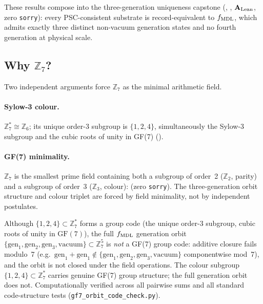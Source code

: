 These results compose into the three-generation uniqueness capstone
(, ,
$\textbf{A}_{\rm Lean}$, zero \texttt{sorry}): every PSC-consistent substrate is record-equivalent to
$f_{\rm MDL}$, which admits exactly three distinct non-vacuum generation states and no
fourth generation at physical scale.

\subsection{Why \texorpdfstring{$\mathbb{Z}_7$}{Z7}?}
\label{sec:why_z7}

Two independent arguments force $\mathbb{Z}_7$ as the minimal arithmetic field.

\paragraph{Sylow-3 colour.}
$\mathbb{Z}_7^* \cong \mathbb{Z}_6$; its unique order-3 subgroup is $\{1,2,4\}$, simultaneously the Sylow-3 subgroup and the cubic roots of unity in GF(7) ().

\paragraph{GF(7) minimality.}
$\mathbb{Z}_7$ is the smallest prime field containing both a subgroup of order~2 ($\mathbb{Z}_2$, parity) and a subgroup of order~3 ($\mathbb{Z}_3$, colour):
 (zero \texttt{sorry}).
The three-generation orbit structure and colour triplet are forced by field minimality, not by independent postulates.

\begin{remark}
\label{rem:not_gf7_group_code}
Although $\{1,2,4\} \subset \mathbb{Z}_7^*$ forms a group code (the unique order-3 subgroup, cubic roots of unity in $\mathrm{GF}(7)$), the full $f_{\rm MDL}$ generation orbit
$\{\mathrm{gen}_1, \mathrm{gen}_2, \mathrm{gen}_3, \mathrm{vacuum}\} \subset \mathbb{Z}_7^5$
is \emph{not} a GF(7) group code: additive closure fails modulo~7 (e.g.\ $\mathrm{gen}_1 + \mathrm{gen}_1 \notin \{\mathrm{gen}_1, \mathrm{gen}_2, \mathrm{gen}_3, \mathrm{vacuum}\}$
componentwise mod~7), and the orbit is not closed under the field operations.
The colour subgroup $\{1,2,4\} \subset \mathbb{Z}_7^*$ carries genuine GF(7) group structure; the full generation orbit does not.
Computationally verified across all pairwise sums and all standard code-structure tests (\texttt{gf7\_orbit\_code\_check.py}).
\end{remark}

